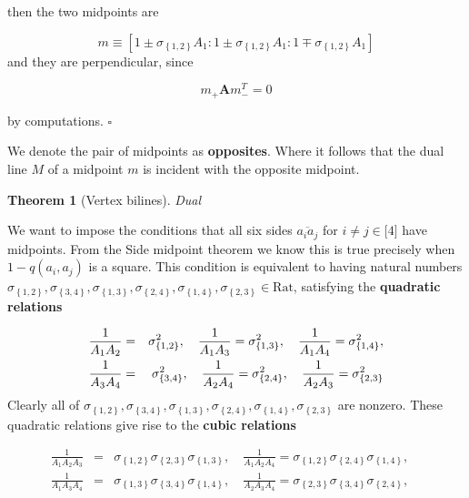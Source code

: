 \documentclass[11pt]{article}
\newtheorem{theorem}{Theorem}
\begin{document}
then the two midpoints are

\begin{equation*}
m\equiv \left[ 1\pm \sigma _{\left\{ 1,2\right\} }A_{1}:1\pm \sigma
_{\left\{ 1,2\right\} }A_{1}:1\mp \sigma _{\left\{ 1,2\right\} }A_{1}\right]
\end{equation*}
and they are perpendicular, since

\begin{equation*}
m_{+}\mathbf{A}m_{-}^{T}=0
\end{equation*}

\bigskip by computations. $\square $

We denote the pair of midpoints as \textbf{opposites}. Where it follows that
the dual line $M$ of a midpoint $m$ is incident with the opposite midpoint.

\begin{theorem}[Vertex bilines]
Dual
\end{theorem}

We want to impose the conditions that all six sides $\overline{a_{i}a_{j}}$
for $i\neq j\in \lbrack 4]$ have midpoints. From the Side midpoint theorem
we know this is true precisely when $1-q(a_{i},a_{j})$ is a square. This
condition is equivalent to having natural numbers $\sigma _{\left\{
1,2\right\} },\sigma _{\left\{ 3,4\right\} },\sigma _{\left\{ 1,3\right\}
},\sigma _{\left\{ 2,4\right\} },\sigma _{\left\{ 1,4\right\} },\sigma
_{\left\{ 2,3\right\} }\in \text{Rat}$, satisfying the \textbf{quadratic
relations}

\begin{eqnarray*}
\frac{1}{A_{1}A_{2}} &=&\sigma _{\left\{ 1,2\right\} }^{2},\quad \frac{1}{%
A_{1}A_{3}}=\sigma _{\left\{ 1,3\right\} }^{2},\quad \frac{1}{A_{1}A_{4}}%
=\sigma _{\left\{ 1,4\right\} }^{2}, \\
\frac{1}{A_{3}A_{4}} &=&\sigma _{\left\{ 3,4\right\} }^{2},\quad \frac{1}{%
A_{2}A_{4}}=\sigma _{\left\{ 2,4\right\} }^{2},\quad \frac{1}{A_{2}A_{3}}%
=\sigma _{\left\{ 2,3\right\} }^{2}
\end{eqnarray*}
Clearly all of $\sigma _{\left\{ 1,2\right\} },\sigma _{\left\{ 3,4\right\}
},\sigma _{\left\{ 1,3\right\} },\sigma _{\left\{ 2,4\right\} },\sigma
_{\left\{ 1,4\right\} },\sigma _{\left\{ 2,3\right\} }$ are nonzero. These
quadratic relations give rise to the \textbf{cubic relations}

\begin{eqnarray*}
\frac{1}{A_{1}A_{2}A_{3}} &=&\sigma _{\left\{ 1,2\right\} }\sigma _{\left\{
2,3\right\} }\sigma _{\left\{ 1,3\right\} },\quad \frac{1}{A_{1}A_{2}A_{4}}%
=\sigma _{\left\{ 1,2\right\} }\sigma _{\left\{ 2,4\right\} }\sigma
_{\left\{ 1,4\right\} },\quad \\
\frac{1}{A_{1}A_{3}A_{4}} &=&\sigma _{\left\{ 1,3\right\} }\sigma _{\left\{
3,4\right\} }\sigma _{\left\{ 1,4\right\} },\quad \frac{1}{A_{2}A_{3}A_{4}}%
=\sigma _{\left\{ 2,3\right\} }\sigma _{\left\{ 3,4\right\} }\sigma
_{\left\{ 2,4\right\} },
\end{eqnarray*}
\end{document}
